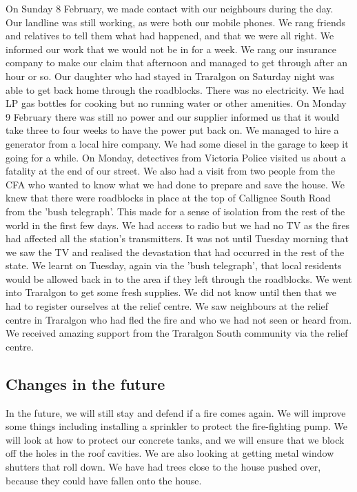 \documentclass[a4paper]{article}
\begin{document}
        On Sunday 8 February, we made contact with our neighbours during the day. Our landline was still working, as were both our mobile phones. We rang friends and relatives to tell them what had happened, and that we were all right. We informed our work that we would not be in for a week.
        We rang our insurance company to make our claim that afternoon and managed to get through after an hour or so.
        Our daughter who had stayed in Traralgon on Saturday night was able to get back home through the roadblocks.
        There was no electricity. We had LP gas bottles for cooking but no running water or other amenities.
        On Monday 9 February there was still no power and our supplier informed us that it would take three to four weeks to have the power put back on. We managed to hire a generator from a local hire company. We had some diesel in the garage to keep it going for a while.
        On Monday, detectives from Victoria Police visited us about a fatality at the end of our street. We also had a visit from two people from the CFA who wanted to know what we had done to prepare and save the house.
        We knew that there were roadblocks in place at the top of Callignee South Road from the 'bush telegraph'. This made for a sense of isolation from the rest of the world in the first few days. We had access to radio but we had no TV as the fires had affected all the station's transmitters. It was not until Tuesday morning that we saw the TV and realised the devastation that had occurred in the rest of the state.
        We learnt on Tuesday, again via the 'bush telegraph', that local residents would be allowed back in to the area if they left through the roadblocks. We went into Traralgon to get some fresh supplies. We did not know until then that we had to register ourselves at the relief centre. We saw neighbours at the relief centre in Traralgon who had fled the fire and who we had not seen or heard from.
        We received amazing support from the Traralgon South community via the relief centre.

    \subsection{Changes in the future}

        In the future, we will still stay and defend if a fire comes again.
        We will improve some things including installing a sprinkler to protect the fire-fighting pump. We will look at how to protect our concrete tanks, and we will ensure that we block off the holes in the roof cavities. We are also looking at getting metal window shutters that roll down.
        We have had trees close to the house pushed over, because they could have fallen onto the house.
\end{document}
